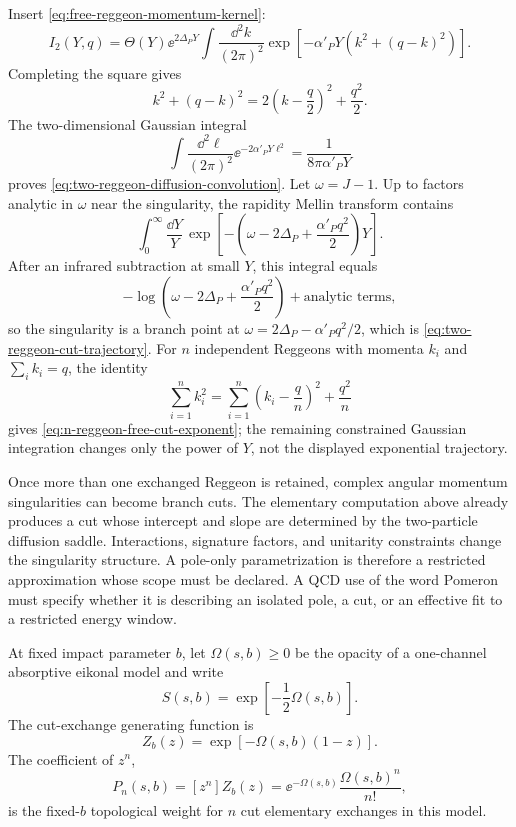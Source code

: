 Insert \eqref{eq:free-reggeon-momentum-kernel}:
\[
  I_2(Y,q)
  =
  \Theta(Y)\ee^{2\Delta_PY}
  \int\frac{\dd^2k}{(2\pi)^2}
  \exp[-\alpha'_PY(k^2+(q-k)^2)].
\]
Completing the square gives
\[
  k^2+(q-k)^2
  =
  2\left(k-\frac q2\right)^2+\frac{q^2}{2}.
\]
The two-dimensional Gaussian integral
\[
  \int\frac{\dd^2\ell}{(2\pi)^2}\ee^{-2\alpha'_PY\ell^2}
  =
  \frac1{8\pi\alpha'_PY}
\]
proves \eqref{eq:two-reggeon-diffusion-convolution}.  Let
\(\omega=J-1\).  Up to factors analytic in \(\omega\) near the singularity,
the rapidity Mellin transform contains
\[
  \int_0^\infty\frac{\dd Y}{Y}\,
  \exp\!\left[
    -\left(\omega-2\Delta_P+\frac{\alpha'_Pq^2}{2}\right)Y
  \right].
\]
After an infrared subtraction at small \(Y\), this integral equals
\[
  -\log\!\left(\omega-2\Delta_P+\frac{\alpha'_Pq^2}{2}\right)
  +\text{analytic terms},
\]
so the singularity is a branch point at
\(\omega=2\Delta_P-\alpha'_Pq^2/2\), which is
\eqref{eq:two-reggeon-cut-trajectory}.  For \(n\) independent Reggeons with
momenta \(k_i\) and \(\sum_i k_i=q\), the identity
\[
  \sum_{i=1}^n k_i^2
  =
  \sum_{i=1}^n\left(k_i-\frac qn\right)^2+\frac{q^2}{n}
\]
gives \eqref{eq:n-reggeon-free-cut-exponent}; the remaining constrained
Gaussian integration changes only the power of \(Y\), not the displayed
exponential trajectory.

\begin{remark}
\label{rem:regge-cuts-as-singularity-data}
Once more than one exchanged Reggeon is retained, complex angular momentum
singularities can become branch cuts.  The elementary computation
above already produces a cut whose intercept and slope are determined by the
two-particle diffusion saddle.  Interactions, signature factors, and unitarity
constraints change the singularity structure.  A pole-only parametrization is
therefore a restricted approximation whose scope must be declared.  A QCD use
of the word Pomeron must specify whether it is describing an isolated pole, a
cut, or an effective fit to a restricted energy window.
\end{remark}

\begin{definition}
\label{def:absorptive-eikonal-cut-generator}
At fixed impact parameter \(b\), let \(\Omega(s,b)\ge0\) be the opacity of a
one-channel absorptive eikonal model and write
\begin{equation}
  S(s,b)=\exp\!\left[-\frac12\Omega(s,b)\right].
  \label{eq:absorptive-eikonal-s-matrix}
\end{equation}
The cut-exchange generating function is
\begin{equation}
  Z_b(z)
  =
  \exp[-\Omega(s,b)(1-z)].
  \label{eq:eikonal-cut-generating-function}
\end{equation}
The coefficient of \(z^n\),
\begin{equation}
  P_n(s,b)
  =
  [z^n]Z_b(z)
  =
  \ee^{-\Omega(s,b)}
  \frac{\Omega(s,b)^n}{n!},
  \label{eq:eikonal-cut-poisson-probability}
\end{equation}
is the fixed-\(b\) topological weight for \(n\) cut elementary exchanges in
this model.
\end{definition}

